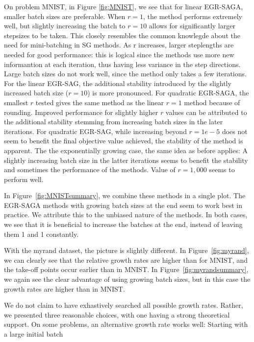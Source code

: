 \documentclass[11pt]{article}
\begin{document}
   
		 
   On problem MNIST, in Figure \ref{fig:MNIST}, we see that for linear EGR-SAGA, smaller batch sizes are preferable. When $r=1$, the method performs extremely well, but slightly increasing the batch to $r=10$ allows for significantly larger stepsizes to be taken. This closely resembles the common knowlegde about the need for mini-batching in SG methods. As r increases, larger steplengths are needed for good performance: this is logical since the methods use more new informantion at each iteration, thus having less variance in the step directions. Large batch sizes do not work well, since the method only takes a few iterations. For the linear EGR-SAG, the additional stability introduced by the slightly increased batch size ($r=10$) is more pronounced.  For quadratic EGR-SAGA, the smallest $r$ tested gives the same method as the linear $r=1$ method because of rounding. Improved performance for slightly higher $r$ values can be attributed to the additional stability stemming from increasing batch sizes in the later iterations. For quadratic EGR-SAG, while increasing beyond $r=1e-5$ does not seem to benefit the final objective value achieved, the stability of the method is apparent. The the exponentially growing case, the same idea as before applies: A slightly increasing batch size in the latter iterations seems to benefit the stability and sometimes the performance of the methods. Value of $r=1,000$ seems to perform well. 
   
   In Figure~\ref{fig:MNISTsummary}, we combine these methods in a single plot. The EGR-SAGA methods with growing batch sizes at the end seem to work best in practice. We attribute this to the unbiased nature of the methods. In both cases, we see that it is beneficial to increase the batches at the end, instead of leaving them 1 and 1 constantly. 

   
   
   With the myrand dataset, the picture is slightly different. In Figure~\ref{fig:myrand}, we can clearly see that the relative growth rates are higher than for MNIST, and the take-off points occur earlier than in MNIST. In Figure~\ref{fig:myrandsummary}, we again see the clear advantage of using growing batch sizes, but in this case the growth rates are higher than in MNIST.
    
  
  We do not claim to have exhastively searched all possible growth rates. Rather, we presented three reasonable choices, with one having a strong theoretical support. On some problems, an alternative growth rate works well: Starting with a large initial batch
\end{document}
